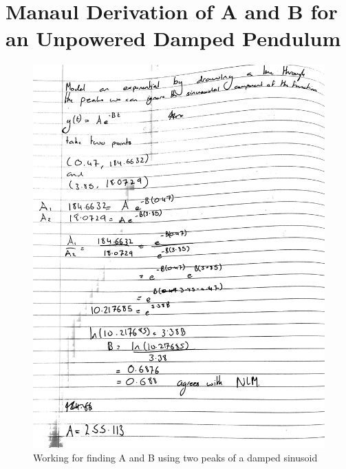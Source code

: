 \documentclass[a4paper, 12pt, compsoc]{IEEEtran}
\begin{document}
        \section{Manaul Derivation of A and B for an Unpowered Damped Pendulum}\label{app:AB}
            \begin{figure}[!h]
                \centering
                \includegraphics[width=0.9\columnwidth]{AB.jpg}
                \caption{Working for finding A and B using two peaks of a damped sinusoid}
                \label{fig:workingAB}
            \end{figure}
\end{document}
